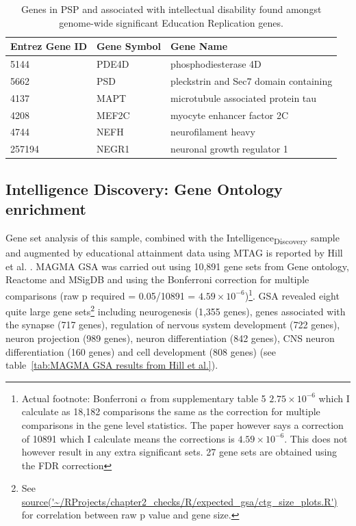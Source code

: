 \begin{table}[ht]
\centering
 \setlength{\extrarowheight}{2pt}
\begin{tabular}{lll}
  \toprule
Entrez Gene ID & Gene Symbol & Gene Name \\
  \midrule
5144 & PDE4D & phosphodiesterase 4D  \\
  5662 & PSD & pleckstrin and Sec7 domain containing \\
  
  4137 & MAPT & microtubule associated protein tau \\ 
  4208 & MEF2C & myocyte enhancer factor 2C \\ 
  4744 & NEFH & neurofilament heavy \\
  257194 & NEGR1 & neuronal growth regulator 1 \\ 
   \bottomrule
\end{tabular}
\caption[Intellectual disability genes in significant in GWGAS of Education Replication]{Genes in PSP and associated with intellectual disability found amongst  genome-wide significant  Education Replication genes.} 
\label{tab:Intellectual disability genes significant in EA2 found in PSP}
\end{table}
 
        
\subsection{Intelligence Discovery: Gene Ontology enrichment}


Gene set analysis of this sample, combined with the Intelligence\textsubscript{Discovery} sample and augmented by educational attainment data using MTAG is reported by Hill et al.  \cite{hill2019combined}. MAGMA GSA was carried out using 10,891 gene sets from Gene ontology, Reactome and MSigDB and using the Bonferroni correction for multiple comparisons (raw p required = 0.05/10891 = $4.59 \times 10^{-6}$)\footnote{Actual footnote: Bonferroni $\alpha$ from supplementary table 5 $2.75\times10^{-6}$ which I calculate as 18,182 comparisons the same as the correction for multiple comparisons in the gene level statistics. The paper however says a correction of 10891 which I calculate means the corrections is $4.59\times10^{-6}$. This does not however result in any extra significant sets.  27 gene sets are obtained using the FDR correction }. GSA revealed eight quite large gene sets\footnote{See \url{source('~/RProjects/chapter2_checks/R/expected_gsa/ctg_size_plots.R')} for correlation between raw p value and gene size.} including neurogenesis (1,355 genes), genes associated with the synapse (717 genes), regulation of nervous system development (722 genes), neuron projection (989 genes), neuron differentiation (842 genes), CNS neuron differentiation (160 genes) and cell development (808 genes) (see table~\ref{tab:MAGMA GSA results from Hill et al.}). 



